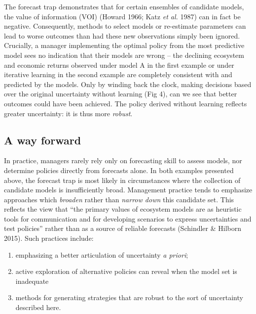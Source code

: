 \documentclass[3p]{elsarticle} %
\providecommand{\tightlist}{%
  \setlength{\itemsep}{0pt}\setlength{\parskip}{0pt}}
\begin{document}
The forecast trap demonstrates that for certain ensembles of candidate
models, the value of information (VOI) (Howard 1966; Katz \emph{et al.}
1987) can in fact be negative. Consequently, methods to select models or
re-estimate parameters can lead to worse outcomes than had these new
observations simply been ignored. Crucially, a manager implementing the
optimal policy from the most predictive model sees no indication that
their models are wrong -- the declining ecosystem and economic returns
observed under model A in the first example or under iterative learning
in the second example are completely consistent with and predicted by
the models. Only by winding back the clock, making decisions based over
the original uncertainty without learning (Fig 4), can we see that
better outcomes could have been achieved. The policy derived without
learning reflects greater uncertainty: it is thus more \emph{robust}.

\hypertarget{a-way-forward}{%
\subsection{A way forward}\label{a-way-forward}}

In practice, managers rarely rely only on forecasting skill to assess
models, nor determine policies directly from forecasts alone. In both
examples presented above, the forecast trap is most likely in
circumstances where the collection of candidate models is insufficiently
broad. Management practice tends to emphasize approaches which
\emph{broaden} rather than \emph{narrow down} this candidate set. This
reflects the view that ``the primary values of ecosystem models are as
heuristic tools for communication and for developing scenarios to
express uncertainties and test policies'' rather than as a source of
reliable forecasts (Schindler \& Hilborn 2015). Such practices include:

\begin{enumerate}
\def\labelenumi{(\alph{enumi})}
\tightlist
\item
  emphasizing a better articulation of uncertainty \emph{a priori};
\item
  active exploration of alternative policies can reveal when the model
  set is inadequate
\item
  methods for generating strategies that are robust to the sort of
  uncertainty described here.
\end{enumerate}
\end{document}
